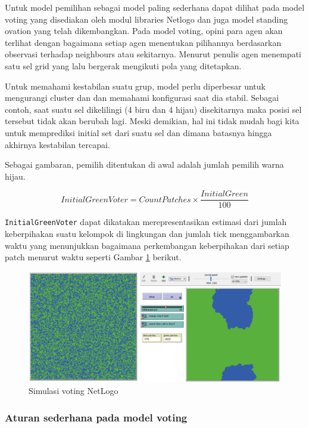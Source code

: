 Untuk model pemilihan sebagai model paling sederhana dapat dilihat pada model voting yang disediakan oleh modul libraries Netlogo dan juga model standing ovation yang telah dikembangkan. Pada model voting, opini para agen akan terlihat dengan bagaimana setiap agen menentukan pilihannya berdasarkan observasi terhadap neighbours atau sekitarnya. Menurut penulis \cite{viridi2019agent} agen menempati satu sel grid yang lalu bergerak mengikuti pola yang ditetapkan.

Untuk memahami kestabilan suatu grup, model perlu diperbesar untuk mengurangi cluster dan  dan memahami konfigurasi saat dia stabil. Sebagai contoh, saat suatu sel dikelilingi (4 biru dan 4 hijau) disekitarnya maka posisi sel tersebut tidak akan berubah lagi. Meski demikian, hal ini tidak mudah bagi kita untuk memprediksi initial set dari suatu sel dan dimana batasnya hingga akhirnya kestabilan tercapai.

Sebagai gambaran, pemilih ditentukan di awal adalah jumlah pemilih warna hijau.

\begin{equation}
	InitialGreenVoter = CountPatches \times \frac{InitialGreen}{100}
\end{equation}

\texttt{InitialGreenVoter} dapat dikatakan merepresentasikan estimasi dari jumlah keberpihakan suatu kelompok di lingkungan dan jumlah tick menggambarkan waktu yang menunjukkan bagaimana perkembangan keberpihakan dari setiap patch menurut waktu seperti Gambar \ref{fig:initvoter} berikut.

\begin{figure}[H]
	\centering
	\includegraphics[width=\linewidth]{images/ch03/InitVoter}
	\caption{Simulasi voting NetLogo}
	\label{fig:initvoter}
\end{figure}

\subsubsection{Aturan sederhana pada model voting}

